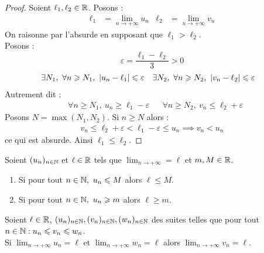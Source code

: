 \begin{proof}
    Soient $\ell_1, \ell_2 \in \mathbb{R}$.
    Posons :
    \begin{align*}
        \ell_1 &= \lim_{n \to +\infty} u_n & \ell_2 &= \lim_{n \to +\infty} v_n
    \end{align*}
    On raisonne par l'absurde en supposant que $\ell_1 > \ell_2$.
    \\
    Posons : 
    \[ \varepsilon = \frac{\ell_1 - \ell_2}{3} > 0 \]
    \begin{align*}
        &\exists N_1,\ \forall n \geqslant N_1,\ \abs{u_n - \ell_1} \leqslant \varepsilon & 
        &\exists N_2,\ \forall n \geqslant N_2,\ \abs{v_n - \ell_2} \leqslant \varepsilon
    \end{align*}
    Autrement dit :
    \begin{align*}
        &\forall n \geq N_1,\ u_n \geq \ell_1 - \varepsilon &
        &\forall n \geq N_2,\ v_n \leq \ell_2 + \varepsilon
    \end{align*}
    Posons $N = \max(N_1, N_2)$. Si $n \geq N$ alors :
    \begin{align*}
        v_n \leq \ell_2 + \varepsilon < \ell_1 - \varepsilon \leq u_n \implies v_n < u_n
    \end{align*}
    ce qui est absurde. Ainsi $\ell_1 \leq \ell_2$.
\end{proof}

\begin{corollary}
    Soient $(u_n)_{n \in \mathbb{N}}$ et $\ell \in \mathbb{R}$ tels que $\lim_{n \to +\infty} = \ell$ et $m, M \in \mathbb{R}$.
    \begin{enumerate}
            \item Si pour tout $n \in \mathbb{N},\ u_n \leqslant M$ alors $\ell \leq M$.
            \item Si pour tout $n \in \mathbb{N},\ u_n \geqslant m$ alors $\ell \geq m$.
    \end{enumerate}
\end{corollary}

\begin{theorem}
    Soient $\ell \in \mathbb{R}$, $(u_n)_{n \in \mathbb{N}}, (v_n)_{n \in \mathbb{N}}, (w_n)_{n \in \mathbb{N}}$ des suites telles que pour tout $n \in \mathbb{N} : u_n \leqslant v_n \leqslant w_n $.
    \\
    Si $\lim_{n \to +\infty} u_n = \ell$ et $\lim_{n \to +\infty} w_n = \ell$ alors $\lim_{n \to + \infty} v_n = \ell$.
\end{theorem}

